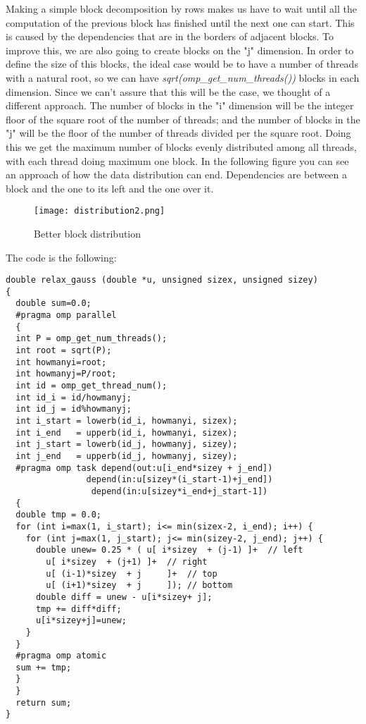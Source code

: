 \justify
Making a simple block decomposition by rows makes us have to wait until all the computation of the previous block has finished until the next one can start. This is caused by the dependencies that are in the borders of adjacent blocks. To improve this, we are also going to create blocks on the "j" dimension.
\justify
In order to define the size of this blocks, the ideal case would be to have a number of threads with a natural root, so we can have \textit{sqrt(omp\_get\_num\_threads())} blocks in each dimension. Since we can't assure that this will be the case, we thought of a different approach. The number of blocks in the "i" dimension will be the integer floor of the square root of the number of threads; and the number of blocks in the "j" will be the floor of the number of threads divided per the square root. Doing this we get the maximum number of blocks evenly distributed among all threads, with each thread doing maximum one block.
\justify
In the following figure you can see an approach of how the data distribution can end. Dependencies are between a block and the one to its left and the one over it.

\begin{figure}[h!]
    \centering
    \texttt{[image: distribution2.png]}
    \caption{Better block distribution}
    \label{fig:distribution2}
\end{figure}


\justify
The code is the following:

\begin{lstlisting}
double relax_gauss (double *u, unsigned sizex, unsigned sizey)
{
  double sum=0.0;
  #pragma omp parallel
  {
  int P = omp_get_num_threads();
  int root = sqrt(P);
  int howmanyi=root;
  int howmanyj=P/root; 
  int id = omp_get_thread_num();
  int id_i = id/howmanyj;
  int id_j = id%howmanyj;
  int i_start = lowerb(id_i, howmanyi, sizex);
  int i_end   = upperb(id_i, howmanyi, sizex);
  int j_start = lowerb(id_j, howmanyj, sizey);
  int j_end   = upperb(id_j, howmanyj, sizey);
  #pragma omp task depend(out:u[i_end*sizey + j_end]) 
                depend(in:u[sizey*(i_start-1)+j_end])
                 depend(in:u[sizey*i_end+j_start-1])
  {
  double tmp = 0.0; 
  for (int i=max(1, i_start); i<= min(sizex-2, i_end); i++) {
    for (int j=max(1, j_start); j<= min(sizey-2, j_end); j++) {
      double unew= 0.25 * ( u[ i*sizey	+ (j-1) ]+  // left
		u[ i*sizey	+ (j+1) ]+  // right
		u[ (i-1)*sizey	+ j     ]+  // top
		u[ (i+1)*sizey	+ j     ]); // bottom
      double diff = unew - u[i*sizey+ j];
      tmp += diff*diff;
      u[i*sizey+j]=unew;
    } 
  }
  #pragma omp atomic
  sum += tmp;
  }
  }
  return sum;
}
\end{lstlisting}

